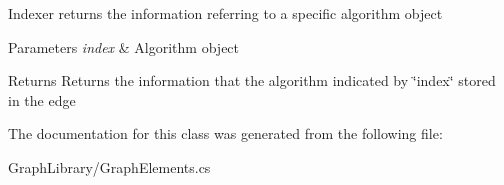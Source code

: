 Indexer returns the information referring to a specific algorithm object 


\begin{DoxyParams}{Parameters}
{\em index} & Algorithm object\\
\hline
\end{DoxyParams}
\begin{DoxyReturn}{Returns}
Returns the information that the algorithm indicated by \char`\"{}index\char`\"{} stored in the edge
\end{DoxyReturn}


The documentation for this class was generated from the following file\+:\begin{DoxyCompactItemize}
\item 
Graph\+Library/Graph\+Elements.\+cs\end{DoxyCompactItemize}

